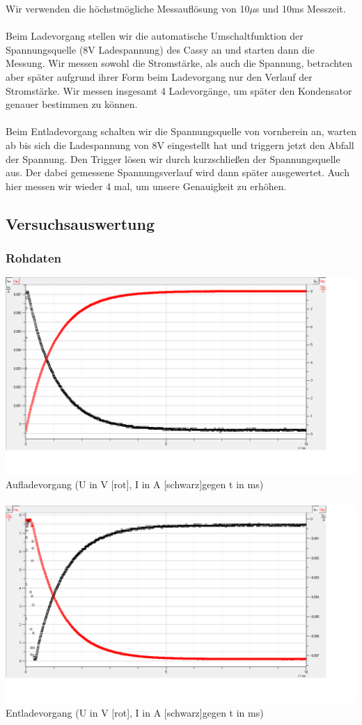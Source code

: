 \documentclass[12pt,a4paper]{article}
\begin{document}
Wir verwenden die höchstmögliche Messauflösung von 10$\mu$s und 10ms Messzeit.\\
\\Beim Ladevorgang stellen wir die automatische Umschaltfunktion der Spannungsquelle (8V Ladespannung) des Cassy an und starten dann die Messung. Wir messen sowohl die Stromstärke, als auch die Spannung, betrachten aber später aufgrund ihrer Form beim Ladevorgang nur den Verlauf der Stromstärke. Wir messen insgesamt 4 Ladevorgänge, um später den Kondensator genauer bestimmen zu können. \\
\\Beim Entladevorgang schalten wir die Spannungsquelle von vornherein an, warten ab bis sich die Ladespannung von 8V eingestellt hat und triggern jetzt den Abfall der Spannung. Den Trigger lösen wir durch kurzschließen der Spannungsquelle aus. Der dabei gemessene Spannungsverlauf wird dann später ausgewertet. Auch hier messen wir wieder 4 mal, um unsere Genauigkeit zu erhöhen.\\
\subsection{Versuchsauswertung}
\subsubsection{Rohdaten}
\includegraphics[scale=0.35]{auf1.png}\\
Aufladevorgang (U in V [rot], I in A [schwarz]gegen t in ms)\\
\\
\includegraphics[scale=0.35]{ent1.png}\\
Entladevorgang (U in V [rot], I in A [schwarz]gegen t in ms)\\
\end{document}
